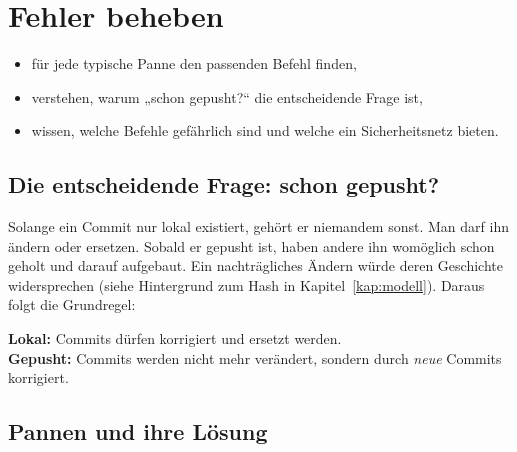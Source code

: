 \chapter{Fehler beheben}
\label{kap:fehler}

\begin{lernziele}
\begin{itemize}[nosep]
  \item für jede typische Panne den passenden Befehl finden,
  \item verstehen, warum „schon gepusht?“ die entscheidende Frage ist,
  \item wissen, welche Befehle gefährlich sind und welche ein Sicherheitsnetz bieten.
\end{itemize}
\end{lernziele}

\section{Die entscheidende Frage: schon gepusht?}

Solange ein Commit nur lokal existiert, gehört er niemandem sonst. Man darf ihn ändern oder
ersetzen. Sobald er gepusht ist, haben andere ihn womöglich schon geholt und darauf
aufgebaut. Ein nachträgliches Ändern würde deren Geschichte widersprechen (siehe Hintergrund
zum Hash in Kapitel~\ref{kap:modell}). Daraus folgt die Grundregel:

\begin{merke}
\textbf{Lokal:} Commits dürfen korrigiert und ersetzt werden.\\
\textbf{Gepusht:} Commits werden nicht mehr verändert, sondern durch \emph{neue} Commits korrigiert.
\end{merke}

\section{Pannen und ihre Lösung}

